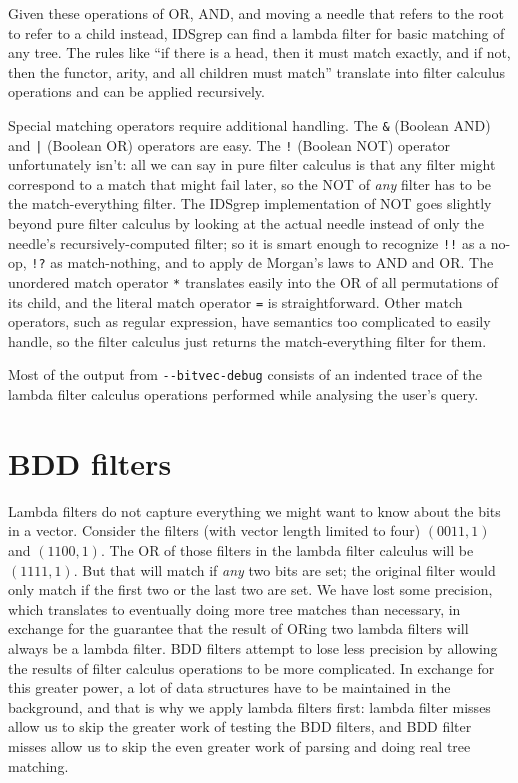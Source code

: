 \documentclass[twocolumn]{report}
\newcommand{\DangerousSection}{\marginpar{\large\hfill
\raisebox{-0.5\baselineskip}[0pt][0pt]{\dbend}\hfill\null}}
\begin{document}
Given these operations of OR, AND, and moving a needle that refers to the
root to refer to a child instead, IDSgrep can find a lambda filter for basic
matching of any tree.  The rules like ``if there is a head, then it must
match exactly, and if not, then the functor, arity, and all children must
match'' translate into filter calculus operations and can be applied
recursively.

Special matching operators require additional handling.  The \texttt{\&}
(Boolean AND) and \texttt{|} (Boolean OR) operators are easy.  The
\texttt{!} (Boolean NOT) operator unfortunately isn't: all we can say in
pure filter calculus is that any filter might correspond to a match that
might fail later, so the NOT of \emph{any} filter has to be the
match-everything filter.  The IDSgrep implementation of NOT goes slightly
beyond pure filter calculus by looking at the actual needle instead of only
the needle's recursively-computed filter; so it is smart enough to recognize
\texttt{!!} as a no-op, \texttt{!?} as match-nothing, and to apply de
Morgan's laws to AND and OR.  The unordered match operator \texttt{*}
translates easily into the OR of all permutations of its child, and the
literal match operator \texttt{=} is straightforward.  Other match
operators, such as regular expression, have semantics too complicated to
easily handle, so the filter calculus just returns the match-everything
filter for them.

Most of the output from \texttt{-{}-bitvec-debug} consists of an indented
trace of the lambda filter calculus operations performed while analysing the
user's query.


\section{BDD filters}\DangerousSection

Lambda filters do not capture everything we might want to
know about the bits in a vector.  Consider the filters (with vector length
limited to four) $(0011,1)$ and $(1100,1)$.  The OR of those filters in the
lambda filter calculus will be $(1111,1)$.  But that will match if
\emph{any} two bits are set; the original filter would only match if the
first two or the last two are set.  We have lost some precision, which
translates to eventually doing more tree matches than necessary, in exchange
for the guarantee that the result of ORing two lambda filters will always be
a lambda filter.  BDD filters attempt to lose less precision by allowing the
results of filter calculus operations to be more complicated.  In exchange
for this greater power, a lot of data structures have to be maintained in
the background, and that is why we apply lambda filters first: lambda filter
misses allow us to skip the greater work of testing the BDD filters, and BDD
filter misses allow us to skip the even greater work of parsing and doing
real tree matching.
\end{document}
